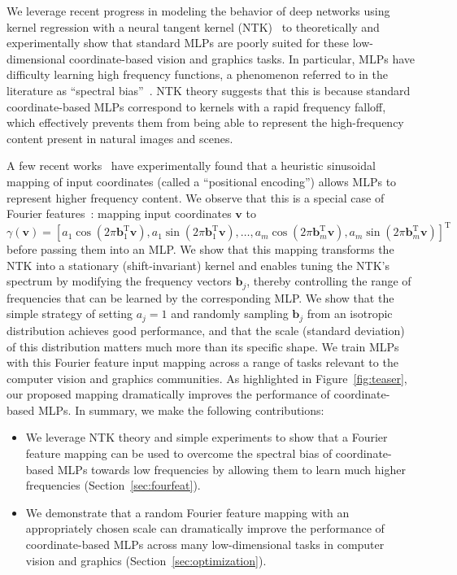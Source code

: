 We leverage recent progress in modeling the behavior of deep networks using kernel regression with a neural tangent kernel (NTK)~\cite{jacot2018neural} to theoretically and experimentally show that standard MLPs are poorly suited for these low-dimensional coordinate-based vision and graphics tasks. In particular, MLPs have difficulty learning high frequency functions, a phenomenon referred to in the literature as ``spectral bias''~\cite{basri2020frequency,rahaman2018spectral}. NTK theory suggests that this is because standard coordinate-based MLPs correspond to kernels with a rapid frequency falloff, which effectively prevents them from being able to represent the high-frequency content present in natural images and scenes.

A few recent works~\cite{mildenhall2020nerf,Zhong2020Reconstructing} have experimentally found that a heuristic sinusoidal mapping of input coordinates (called a ``positional encoding'') allows MLPs to represent higher frequency content. We observe that this is a special case of Fourier features~\cite{rahimi2007}: mapping input coordinates $\mathbf{v}$ to $
\gamma(\mathbf{v}) = \left[
    a_1 \cos(2 \pi \mathbf b_1^\mathrm{T} \mathbf{v}),
    a_1 \sin(2 \pi \mathbf b_1^\mathrm{T} \mathbf{v}), 
    \ldots, 
    a_m \cos(2 \pi \mathbf b_m^\mathrm{T} \mathbf{v}),
    a_m \sin(2 \pi \mathbf b_m^\mathrm{T} \mathbf{v}) \right]^\mathrm{T}$
before passing them into an MLP. We show that this mapping transforms the NTK into a stationary (shift-invariant) kernel and enables tuning the NTK's spectrum by modifying the frequency vectors $\mathbf b_j$, thereby controlling the range of frequencies that can be learned by the corresponding MLP. We show that the simple strategy of setting $a_j=1$ and randomly sampling $\mathbf b_j$ from an isotropic distribution achieves good performance, and that the scale (standard deviation) of this distribution matters much more than its specific shape. We train MLPs with this Fourier feature input mapping across a range of tasks relevant to the computer vision and graphics communities. As highlighted in Figure~\ref{fig:teaser}, our proposed mapping dramatically improves the performance of coordinate-based MLPs. In summary, we make the following contributions:

\begin{itemize}[leftmargin=*]
\item We leverage NTK theory and simple experiments to show that a Fourier feature mapping can be used to overcome the spectral bias of coordinate-based MLPs towards low frequencies by allowing them to learn much higher frequencies (Section~\ref{sec:fourfeat}).

\item We demonstrate that a random Fourier feature mapping with an appropriately chosen scale can dramatically improve the performance of coordinate-based MLPs across many low-dimensional tasks in computer vision and graphics (Section~\ref{sec:optimization}).

\end{itemize}

